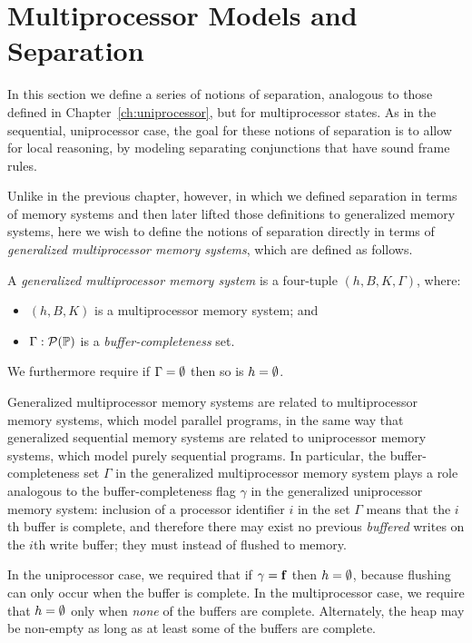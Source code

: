 \documentclass[11pt]{report}
\begin{document}
\section{Multiprocessor Models and Separation}

In this section we define a series of notions of separation, analogous to those defined in Chapter~\ref{ch:uniprocessor}, but for multiprocessor states. As in the sequential, uniprocessor case, the goal for these notions of separation is to allow for local reasoning, by modeling separating conjunctions that have sound frame rules. 

Unlike in the previous chapter, however, in which we defined separation in terms of memory systems and then later lifted those definitions to generalized memory systems, here we wish to define the notions of separation directly in terms of \emph{generalized multiprocessor memory systems}, which are defined as follows. 

\begin{definition}
  A \emph{generalized multiprocessor memory system} is a four-tuple $(h,B,K,\Gamma)$, where: 
  \begin{itemize}
    \item $(h,B,K)$ is a multiprocessor memory system; and 
    \item $\Gamma : \mathcal{P}(\mathbb{P})$ is a \emph{buffer-completeness} set. 
  \end{itemize} We furthermore require if $\Gamma = \operatorname{\emptyset}$ then so is $h = \operatorname{\emptyset}$. 
\end{definition}

Generalized multiprocessor memory systems are related to multiprocessor memory systems, which model parallel programs, in the same way that generalized sequential memory systems are related to uniprocessor memory systems, which model purely sequential programs. In particular, the buffer-completeness set $\Gamma$ in the generalized multiprocessor memory system plays a role analogous to the buffer-completeness flag $\gamma$ in the generalized uniprocessor memory system: inclusion of a processor identifier $i$ in the set $\Gamma$ means that the $i$th buffer is complete, and therefore there may exist no previous \emph{buffered} writes on the $i$th write buffer; they must instead of flushed to memory. 

In the uniprocessor case, we required that if $\gamma = \mathbf{f}$ then $h = \operatorname{\emptyset}$, because flushing can only occur when the buffer is complete. In the multiprocessor case, we require that $h = \operatorname{\emptyset}$ only when \emph{none} of the buffers are complete. Alternately, the heap may be non-empty as long as at least some of the buffers are complete. 
\end{document}
